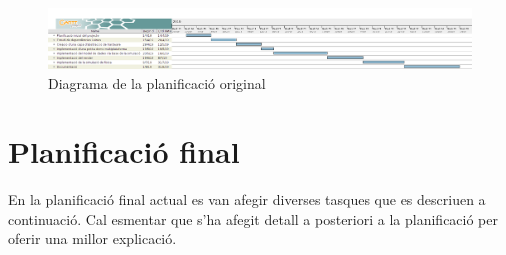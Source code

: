 \begin{figure}[H]
  \centering
  \includegraphics[angle=90,origin=c,scale=0.35]{img/planificacioOG}
  \caption{Diagrama de la planificació original}
\end{figure}
\section{Planificació final}
En la planificació final actual es van afegir diverses tasques que es descriuen a continuació. Cal esmentar que s'ha afegit detall a posteriori a la planificació per oferir una millor explicació.
